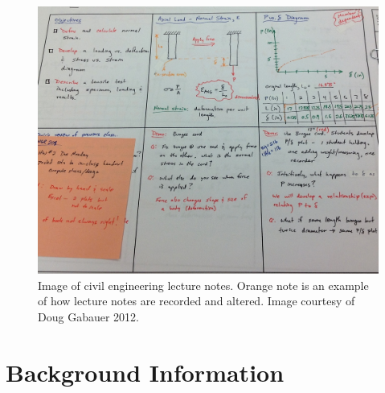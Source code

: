 \documentclass{article}
\begin{document}
		\begin{figure}[H]
      			\centering
      			\includegraphics[scale=0.2]{./images/cive-notes.png}
			\caption{Image of civil engineering lecture notes. Orange note is an example of how lecture notes are recorded and altered. Image courtesy of Doug Gabauer 2012.}
			\label{fig:cive-notes}
   		 \end{figure}
		
	\section{Background Information}
\end{document}
